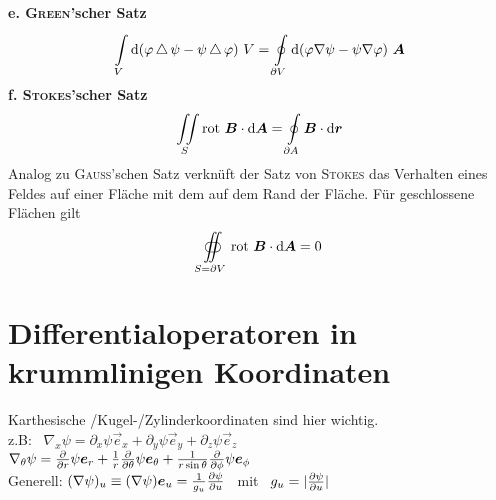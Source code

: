 \ \\
\textbf{e. \textsc{Green}'scher Satz}\\
\begin{equation*}
\int\limits_{{V}}^{{}}\mathrm{d}{(\varphi\mathop{{}\bigtriangleup}\nolimits\psi-\psi\mathop{{}\bigtriangleup}\nolimits\varphi)}\ {V}=\oint\limits_{{\partial V}}^{{}}\mathrm{d}{(\varphi\nabla\psi-\psi\nabla\varphi)}\ {\bm{A}}
\end{equation*}
\linebreak
\textbf{f. \textsc{Stokes}'scher Satz}\\
\begin{equation*}
\iint\limits_S\text{rot }\bm{B}\cdot\mathrm{d}\bm{A}=\oint\limits_{\partial A}\bm{B}\cdot\mathrm{d}\bm{r}
\end{equation*}
Analog zu \textsc{Gauss}'schen Satz verknüft der Satz von \textsc{Stokes} das Verhalten eines Feldes auf einer Fläche mit dem auf dem Rand der Fläche. Für geschlossene Flächen gilt
\begin{equation*}
\oiint\limits_{S=\partial V}\text{rot }\bm{B}\cdot\mathrm{d}\bm{A}=0
\end{equation*}

\section{Differentialoperatoren in krummlinigen Koordinaten}
Karthesische /Kugel-/Zylinderkoordinaten sind hier wichtig.\\
\linebreak
z.B: \ $\nabla_x\psi=\partial_x\psi\vec{e}_x+\partial_y\psi\vec{e}_y+\partial_z\psi\vec{e}_z$\\
\linebreak
$\nabla_\theta\psi=\frac{\partial{}}{\partial{r}}\psi\bm{e}_r+\frac{1}{r}\frac{\partial{}}{\partial{\theta}}\psi\bm{e}_\theta+\frac{1}{r\sin\theta}\frac{\partial{}}{\partial{\phi}}\psi\bm{e}_\phi$\\
\linebreak
Generell: $(\nabla\psi)_u\equiv(\nabla\psi)\bm{e}_u=\frac{1}{g_u}\frac{\partial{\psi}}{\partial{u}}$ \ mit \ $g_u=|\frac{\partial{\psi}}{\partial{u}}|$\\

